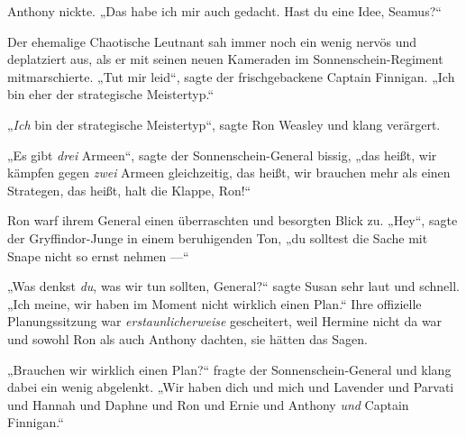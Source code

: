 Anthony nickte.
„Das habe ich mir auch gedacht. Hast du eine Idee, Seamus?“

Der ehemalige Chaotische Leutnant sah immer noch ein wenig nervös und deplatziert aus, als er mit seinen neuen Kameraden im Sonnenschein-Regiment mitmarschierte.
„Tut mir leid“, sagte der frischgebackene Captain Finnigan.
„Ich bin eher der strategische Meistertyp.“

„\emph{Ich} bin der strategische Meistertyp“, sagte Ron Weasley und klang verärgert.

„Es gibt \emph{drei} Armeen“, sagte der Sonnenschein-General bissig, „das heißt, wir kämpfen gegen \emph{zwei} Armeen gleichzeitig, das heißt, wir brauchen mehr als einen Strategen, das heißt, halt die Klappe, Ron!“

Ron warf ihrem General einen überraschten und besorgten Blick zu.
„Hey“, sagte der Gryffindor-Junge in einem beruhigenden Ton, „du solltest die Sache mit Snape nicht so ernst nehmen —“

„Was denkst \emph{du}, was wir tun sollten, General?“ sagte Susan sehr laut und schnell.
„Ich meine, wir haben im Moment nicht wirklich einen Plan.“ Ihre offizielle Planungssitzung war \emph{erstaunlicherweise} gescheitert, weil Hermine nicht da war und sowohl Ron als auch Anthony dachten, sie hätten das Sagen.

„Brauchen wir wirklich einen Plan?“ fragte der Sonnenschein-General und klang dabei ein wenig abgelenkt.
„Wir haben dich und mich und Lavender und Parvati und Hannah und Daphne und Ron und Ernie und Anthony \emph{und} Captain Finnigan.“

